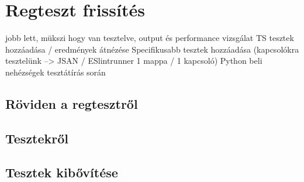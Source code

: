 \chapter{Regteszt frissítés}\label{chap:Regteszt frissítés}

jobb lett, mükszi
hogy van tesztelve, output és performance vizsgálat
TS tesztek hozzáadása / eredmények átnézése
Specifikusabb tesztek hozzáadása (kapcsolókra tesztelünk --> JSAN / ESlintrunner 1 mappa / 1 kapcsoló)
Python beli nehézségek tesztátírás során


\section{Röviden a regtesztről}

\section{Tesztekről}

\section{Tesztek kibővítése}